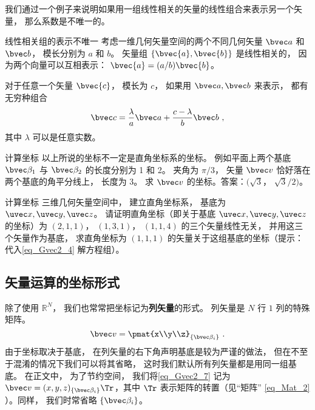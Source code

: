 我们通过一个例子来说明如果用一组线性相关的矢量的线性组合来表示另一个矢量， 那么系数是不唯一的。

\begin{example}{线性相关组的表示不唯一}
考虑一维几何矢量空间的两个不同几何矢量 $\bvec a$ 和 $\bvec b$， 模长分别为 $a$ 和 $b$。 矢量组 $\{\bvec{a}, \bvec{b}\}$ 是线性相关的， 因为两个向量可以互相表示： $\bvec{a}=(a/b)\bvec{b}$。

对于任意一个矢量 $\bvec{c}$， 模长为 $c$， 如果用 $\bvec a, \bvec b$ 来表示， 都有无穷种组合
\begin{equation}
\bvec c = \frac{\lambda}{a} \bvec a + \frac{c - \lambda}{b} \bvec b~,
\end{equation}
其中 $\lambda$ 可以是任意实数。
\end{example}

\begin{exercise}{计算坐标}
以上所说的坐标不一定是直角坐标系的坐标。 例如平面上两个基底 $\bvec \beta_1$ 与 $\bvec \beta_2$ 的长度分别为 1 和 2。 夹角为 $\pi/3$， 矢量 $\bvec v$ 恰好落在两个基底的角平分线上， 长度为 3。 求 $\bvec v$ 的坐标。答案：$(\sqrt 3$， $\sqrt 3/2)$。
\end{exercise}

\begin{exercise}{计算坐标}
三维几何矢量空间中， 建立直角坐标系， 基底为 $\uvec x, \uvec y, \uvec z$。 请证明直角坐标（即关于基底 $\uvec x, \uvec y, \uvec z$ 的坐标）为 $(2, 1, 1)$， $(1, 3, 1)$， $(1, 1, 4)$ 的三个矢量线性无关， 并用这三个矢量作为基底， 求直角坐标为 $(1, 1, 1)$ 的矢量关于这组基底的坐标（提示：代入\autoref{eq_Gvec2_4} 解方程组）。
\end{exercise}

\subsection{矢量运算的坐标形式}
除了使用 $\mathbb R^N$， 我们也常常把坐标记为\textbf{列矢量}的形式。 列矢量是 $N$ 行 $1$ 列的特殊矩阵。
\begin{equation}\label{eq_Gvec2_7}
\bvec v = \pmat{x\\y\\z}_{\{\bvec\beta_i\}}~.
\end{equation}
由于坐标取决于基底， 在列矢量的右下角声明基底是较为严谨的做法， 但在不至于混淆的情况下我们可以将其省略， 这时我们默认所有列矢量都是用同一组基底。 在正文中， 为了节约空间， 我们将\autoref{eq_Gvec2_7} 记为 $\bvec v = (x, y, z)_{\{\bvec\beta_i\}}\Tr$，其中 $\Tr$ 表示矩阵的转置（见“矩阵” \autoref{eq_Mat_2} ）。同样， 我们时常省略 $\{\bvec\beta_i\}$。

